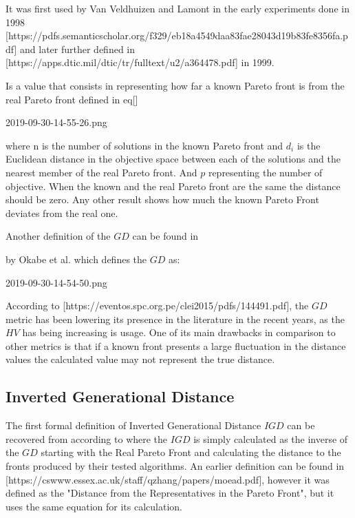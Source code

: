 It was first used by Van Veldhuizen and Lamont in the early experiments done in 1998 [https://pdfs.semanticscholar.org/f329/eb18a4549daa83fae28043d19b83fe8356fa.pdf] and later further defined in [https://apps.dtic.mil/dtic/tr/fulltext/u2/a364478.pdf] in 1999.

Is a value that consists in representing how far a known Pareto front is from the real Pareto front defined in eq[]


2019-09-30-14-55-26.png

where n is the number of solutions in the known Pareto front and $d_i$ is the Euclidean distance in the objective space between each of the solutions and the nearest member of the real Pareto front. And $p$ representing the number of objective. When the known and the real Pareto front are the same the distance should be zero. Any other result shows how much the known Pareto Front deviates from the real one. 

Another definition of the $GD$ can be found in %

by Okabe et al. which defines the $GD$ as:

2019-09-30-14-54-50.png

According to [https://eventos.spc.org.pe/clei2015/pdfs/144491.pdf], the $GD$ metric has been lowering its presence in the literature in the recent years, as the $HV$ has being increasing is usage. One of its main drawbacks in comparison to other metrics is that if a known front presents a large fluctuation in the distance values the calculated value may not represent the true distance.

\subsection{Inverted Generational Distance}

The first formal definition of Inverted Generational Distance $IGD$ can be recovered from 
according to 
where the $IGD$ is simply calculated as the inverse of the $GD$ starting with the Real Pareto Front and calculating the distance to the fronts produced by their tested algorithms. An earlier definition can be found in [https://cswww.essex.ac.uk/staff/qzhang/papers/moead.pdf], however it was defined as the "Distance from the Representatives in the Pareto Front", but it uses the same equation for its calculation.

